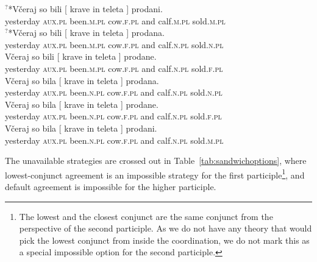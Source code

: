 \documentclass[output=paper
,modfonts
,nonflat]{langsci/langscibook}
\begin{document}
\begin{exe}
\ex \label{allpossiblesand}
\begin{xlist}
\ex \label{alldefdef}\gll $^?$*Včeraj      so    bili       [ krave    in    teleta ]    prodani.\\
yesterday \textsc{aux.pl} been.\textsc{m.pl} {} cow.\textsc{f.pl} and calf.\textsc{m.pl} {}   sold.\textsc{m.pl}\\
\ex \label{alldefcca}\gll $^?$*Včeraj      so    bili       [ krave    in    teleta ]    prodana. \\
yesterday \textsc{aux.pl} been.\textsc{m.pl} {} cow.\textsc{f.pl} and calf.\textsc{n.pl} {}   sold.\textsc{n.pl}\\
\ex \label{alldefhca}\gll  *Včeraj      so    bili       [ krave    in    teleta ]    prodane. \\
yesterday \textsc{aux.pl} been.\textsc{m.pl} {} cow.\textsc{f.pl} and calf.\textsc{n.pl} {}   sold.\textsc{f.pl}\\
\ex \label{alllcacca}\gll  *Včeraj      so    bila       [ krave    in    teleta ]    prodana. \\
yesterday \textsc{aux.pl} been.\textsc{n.pl} {} cow.\textsc{f.pl} and calf.\textsc{n.pl} {}   sold.\textsc{n.pl}\\
\ex \label{alllcahca}\gll  *Včeraj      so    bila       [ krave    in    teleta ]    prodane. \\
yesterday \textsc{aux.pl} been.\textsc{n.pl} {} cow.\textsc{f.pl} and calf.\textsc{n.pl} {}   sold.\textsc{f.pl}\\
\ex \label{alllcadef}\gll  *Včeraj      so    bila       [ krave    in    teleta ]    prodani. \\
yesterday \textsc{aux.pl} been.\textsc{n.pl} {} cow.\textsc{f.pl} and calf.\textsc{n.pl} {}   sold.\textsc{m.pl}\\
\end{xlist}
\end{exe}
The unavailable strategies are crossed out in Table~\ref{tab:sandwichoptions}, where lowest-conjunct agreement is an impossible strategy for the first participle\footnote{The lowest and the closest conjunct are the same conjunct from the perspective of the second participle. As we do not have any theory that would pick the lowest conjunct from inside the coordination, we do not mark this as a special impossible option for the second participle.}, and default agreement is impossible for the higher participle.
\end{document}

